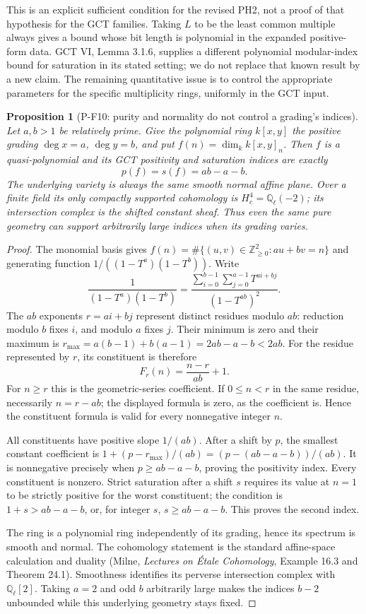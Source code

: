 \documentclass[11pt,a4paper]{article}
\newtheorem{proposition}{Proposition}[section]
\begin{document}
This is an explicit sufficient condition for the revised PH2, not a proof
of that hypothesis for the GCT families. Taking $L$ to be the least common
multiple always gives a bound whose bit length is polynomial in the
expanded positive-form data. GCT VI, Lemma 3.1.6, supplies a different
polynomial modular-index bound for saturation in its stated setting;
we do not replace that known result by a new claim. The remaining
quantitative issue is to control the appropriate parameters for the
specific multiplicity rings, uniformly in the GCT input.

\begin{proposition}[P-F10: purity and normality do not control a grading's indices]
\label{prop:weightedplane}
Let $a,b>1$ be relatively prime. Give the polynomial ring $k[x,y]$ the
positive grading $\deg x=a$, $\deg y=b$, and put
$f(n)=\dim_k k[x,y]_n$. Then $f$ is a quasi-polynomial and its GCT
positivity and saturation indices are exactly
\[
 p(f)=s(f)=ab-a-b.
 \tag{P-F10}
\]
The underlying variety is always the same smooth normal affine plane.
Over a finite field its only compactly supported cohomology is
$H_c^4=\mathbb Q_\ell(-2)$; its intersection complex is the shifted
constant sheaf. Thus even the same pure geometry can support arbitrarily
large indices when its grading varies.
\end{proposition}
\begin{proof}
The monomial basis gives
$f(n)=\#\{(u,v)\in\mathbb Z_{\ge0}^2:au+bv=n\}$ and generating function
$1/((1-T^a)(1-T^b))$. Write
\[
 \frac1{(1-T^a)(1-T^b)}
 =\frac{\displaystyle\sum_{i=0}^{b-1}\sum_{j=0}^{a-1}T^{ai+bj}}
 {(1-T^{ab})^2}.
\]
The $ab$ exponents $r=ai+bj$ represent distinct residues modulo $ab$:
reduction modulo $b$ fixes $i$, and modulo $a$ fixes $j$.
Their minimum is zero and their maximum is
$r_{\max}=a(b-1)+b(a-1)=2ab-a-b<2ab$.
For the residue represented by $r$, its constituent is therefore
\[
 F_r(n)=\frac{n-r}{ab}+1.
\]
For $n\ge r$ this is the geometric-series coefficient.
If $0\le n<r$ in the same residue, necessarily $n=r-ab$;
the displayed formula is zero, as the coefficient is. Hence the
constituent formula is valid for every nonnegative integer $n$.

All constituents have positive slope $1/(ab)$. After a shift by $p$,
the smallest constant coefficient is
$1+(p-r_{\max})/(ab)=(p-(ab-a-b))/(ab)$.
It is nonnegative precisely when $p\ge ab-a-b$, proving the positivity
index. Every constituent is nonzero. Strict saturation after a shift
$s$ requires its value at $n=1$ to be strictly positive for the worst
constituent; the condition is $1+s>ab-a-b$, or, for integer $s$,
$s\ge ab-a-b$. This proves the second index.

The ring is a polynomial ring independently of its grading, hence its
spectrum is smooth and normal. The cohomology statement is the standard
affine-space calculation and duality (Milne, \emph{Lectures on \'Etale
Cohomology}, Example 16.3 and Theorem 24.1). Smoothness identifies its
perverse intersection complex with $\mathbb Q_\ell[2]$.
Taking $a=2$ and odd $b$ arbitrarily large makes the indices $b-2$
unbounded while this underlying geometry stays fixed.
\end{proof}
\end{document}
